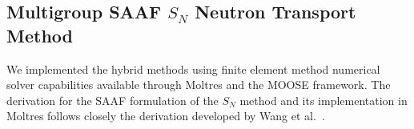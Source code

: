 \documentclass[letterpaper]{mc2025}
\begin{document}

\subsection{Multigroup \Gls{SAAF} $S_N$ Neutron Transport Method} \label{sec:saaf}

We implemented the hybrid methods using finite element method numerical solver capabilities available through
Moltres \cite{lindsay_introduction_2018} and the \gls{MOOSE} framework.
The derivation for the \gls{SAAF} formulation of the $S_N$ method and its
implementation in Moltres follows closely the derivation developed by Wang et al.\
\cite{wang_diffusion_2014, wang_rattlesnake_2018}.
\end{document}
